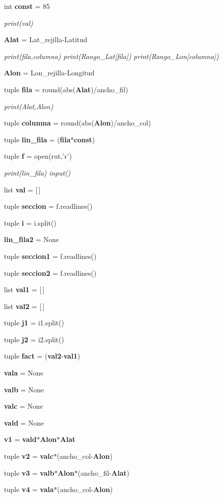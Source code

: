 \begin{DoxyCompactItemize}
\item 
int {\bf const} = 85
\begin{DoxyCompactList}\small\item\em print(val) \end{DoxyCompactList}\item 
{\bf Alat} = Lat\-\_\-rejilla-\/Latitud
\begin{DoxyCompactList}\small\item\em print(fila,columna) print(\-Rango\-\_\-\-Lat[fila]) print(\-Rango\-\_\-\-Lon[columna]) \end{DoxyCompactList}\item 
{\bf Alon} = Lon\-\_\-rejilla-\/Longitud
\item 
tuple {\bf fila} = round(abs({\bf Alat})/ancho\-\_\-fil)
\begin{DoxyCompactList}\small\item\em print(\-Alat,\-Alon) \end{DoxyCompactList}\item 
tuple {\bf columna} = round(abs({\bf Alon})/ancho\-\_\-col)
\item 
tuple {\bf lin\-\_\-fila} = ({\bf fila}$\ast${\bf const})
\item 
tuple {\bf f} = open(rut,'r')
\begin{DoxyCompactList}\small\item\em print(lin\-\_\-fila) input() \end{DoxyCompactList}\item 
list {\bf val} = [$\,$]
\item 
tuple {\bf seccion} = f.\-readlines()
\item 
tuple {\bf i} = i.\-split()
\item 
{\bf lin\-\_\-fila2} = None
\item 
tuple {\bf seccion1} = f.\-readlines()
\item 
tuple {\bf seccion2} = f.\-readlines()
\item 
list {\bf val1} = [$\,$]
\item 
list {\bf val2} = [$\,$]
\item 
tuple {\bf j1} = i1.\-split()
\item 
tuple {\bf j2} = i2.\-split()
\item 
tuple {\bf fact} = ({\bf val2}-\/{\bf val1})
\item 
{\bf vala} = None
\item 
{\bf valb} = None
\item 
{\bf valc} = None
\item 
{\bf vald} = None
\item 
{\bf v1} = {\bf vald}$\ast${\bf Alon}$\ast${\bf Alat}
\item 
tuple {\bf v2} = {\bf valc}$\ast$(ancho\-\_\-col-\/{\bf Alon})
\item 
tuple {\bf v3} = {\bf valb}$\ast${\bf Alon}$\ast$(ancho\-\_\-fil-\/{\bf Alat})
\item 
tuple {\bf v4} = {\bf vala}$\ast$(ancho\-\_\-col-\/{\bf Alon})
\end{DoxyCompactItemize}


